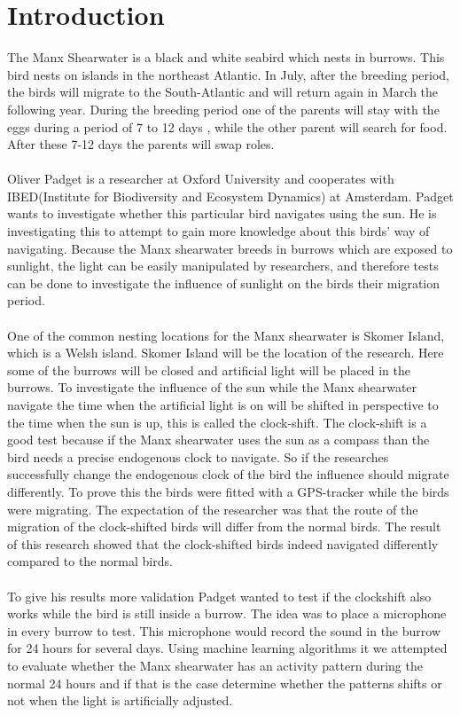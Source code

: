 \documentclass[a4paper]{article}
\begin{document}
\section*{Introduction}
The Manx Shearwater is a black and white seabird which nests in burrows. This bird nests on islands in the northeast Atlantic. In July, after the breeding period, the birds will migrate to the South-Atlantic and will return again in March the following year. During the breeding period one of the parents will stay with the eggs during a period of 7 to 12 days , while the other parent will search for food. After these 7-12 days the parents will swap roles.\\\\
Oliver Padget is a researcher at Oxford University and cooperates with IBED(Institute for Biodiversity and Ecosystem Dynamics) at Amsterdam. Padget wants to investigate whether this particular bird navigates using the sun. He is investigating this to attempt to gain more knowledge about this birds' way of navigating. Because the Manx shearwater breeds in burrows which are exposed to sunlight, the light can be easily manipulated by researchers, and therefore tests can be done to investigate the influence of sunlight on the birds their migration period.\\\\
One of the common nesting locations for the Manx shearwater is Skomer Island, which is a Welsh island. Skomer Island will be the location of the research. Here some of the burrows will be closed and artificial light will be placed in the burrows. To investigate the influence of the sun while the Manx shearwater navigate the time when the artificial light is on will be shifted in perspective to the time when the sun is up, this is called the clock-shift. The clock-shift is a good test because if the Manx shearwater uses the sun as a compass than the bird needs a precise endogenous clock to navigate. So if the researches successfully change the endogenous clock of the bird the influence should migrate differently. To prove this the birds were fitted with a GPS-tracker while the birds were migrating. The expectation of the researcher was that the route of the migration of the clock-shifted birds will differ from the normal birds. The result of this research showed that the clock-shifted birds indeed navigated differently compared to the normal birds.\\\\
To give his results more validation Padget wanted to test if the clockshift also works while the bird is still inside a burrow. The idea was to place a microphone in every burrow to test. This microphone would record the sound in the burrow for 24 hours for several days. Using machine learning algorithms it we attempted to evaluate whether the Manx shearwater has an activity pattern during the normal 24 hours and if that is the case determine whether the patterns shifts or not when the light is artificially adjusted.
\end{document}
